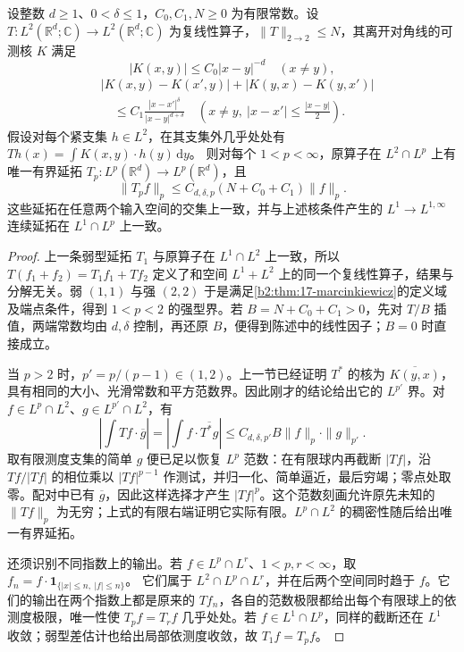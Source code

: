 \begin{theorem}\label{b2:thm:18-cz-lp}
设整数 \(d\geq1\)、\(0<\delta\leq1\)，\(C_0,C_1,N\geq0\) 为有限常数。设 \(T:L^2(\mathbb R^d;\mathbb C)\to L^2(\mathbb R^d;\mathbb C)\) 为复线性算子，\(\|T\|_{2\to2}\leq N\)，其离开对角线的可测核 \(K\) 满足
\[
 |K(x,y)|\leq C_0|x-y|^{-d}\quad(x\ne y),
\]
\[
 \begin{aligned}
 &|K(x,y)-K(x',y)|+|K(y,x)-K(y,x')|\\
 &\quad\leq C_1\frac{|x-x'|^\delta}{|x-y|^{d+\delta}}
 \quad\left(x\ne y,\ |x-x'|\leq\frac{|x-y|}2\right).
 \end{aligned}
\]
假设对每个紧支集 \(h\in L^2\)，在其支集外几乎处处有
\(Th(x)=\int K(x,y)\cdot h(y)\,\mathrm dy\)。
则对每个 \(1<p<\infty\)，原算子在 \(L^2\cap L^p\) 上有唯一有界延拓 \(T_p:L^p(\mathbb R^d)\to L^p(\mathbb R^d)\)，且
\[
 \|T_pf\|_p\leq C_{d,\delta,p}(N+C_0+C_1)\|f\|_p.
\]
这些延拓在任意两个输入空间的交集上一致，并与上述核条件产生的 \(L^1\to L^{1,\infty}\) 连续延拓在 \(L^1\cap L^p\) 上一致。
\end{theorem}
\begin{proof}
上一条弱型延拓 \(T_1\) 与原算子在 \(L^1\cap L^2\) 上一致，所以
\(T(f_1+f_2)=T_1f_1+Tf_2\)
定义了和空间 \(L^1+L^2\) 上的同一个复线性算子，结果与分解无关。弱 \((1,1)\) 与强 \((2,2)\) 于是满足\cref{b2:thm:17-marcinkiewicz}的定义域及端点条件，得到 \(1<p<2\) 的强型界。若 \(B=N+C_0+C_1>0\)，先对 \(T/B\) 插值，两端常数均由 \(d,\delta\) 控制，再还原 \(B\)，便得到陈述中的线性因子；\(B=0\) 时直接成立。

当 \(p>2\) 时，\(p'=p/(p-1)\in(1,2)\)。上一节已经证明 \(T^*\) 的核为 \(\overline{K(y,x)}\)，具有相同的大小、光滑常数和平方范数界。因此刚才的结论给出它的 \(L^{p'}\) 界。对 \(f\in L^p\cap L^2\)、\(g\in L^{p'}\cap L^2\)，有
\[
 \left|\int Tf\cdot\overline g\right|
 =\left|\int f\cdot\overline{T^*g}\right|
 \leq C_{d,\delta,p'}B\|f\|_p\cdot\|g\|_{p'}.
\]
取有限测度支集的简单 \(g\) 便已足以恢复 \(L^p\) 范数：在有限球内再截断 \(|Tf|\)，沿 \(Tf/|Tf|\) 的相位乘以 \(|Tf|^{p-1}\) 作测试，并归一化、简单逼近，最后穷竭；零点处取零。配对中已有 \(\overline g\)，因此这样选择才产生 \(|Tf|^p\)。这个范数刻画允许原先未知的 \(\|Tf\|_p\) 为无穷；上式的有限右端证明它实际有限。\(L^p\cap L^2\) 的稠密性随后给出唯一有界延拓。

还须识别不同指数上的输出。若 \(f\in L^p\cap L^r\)、\(1<p,r<\infty\)，取
\(f_n=f\cdot\mathbf1_{\{|x|\leq n,\ |f|\leq n\}}\)。
它们属于 \(L^2\cap L^p\cap L^r\)，并在后两个空间同时趋于 \(f\)。它们的输出在两个指数上都是原来的 \(Tf_n\)，各自的范数极限都给出每个有限球上的依测度极限，唯一性使 \(T_pf=T_rf\) 几乎处处。若 \(f\in L^1\cap L^p\)，同样的截断还在 \(L^1\) 收敛；弱型差估计也给出局部依测度收敛，故 \(T_1f=T_pf\)。
\end{proof}

